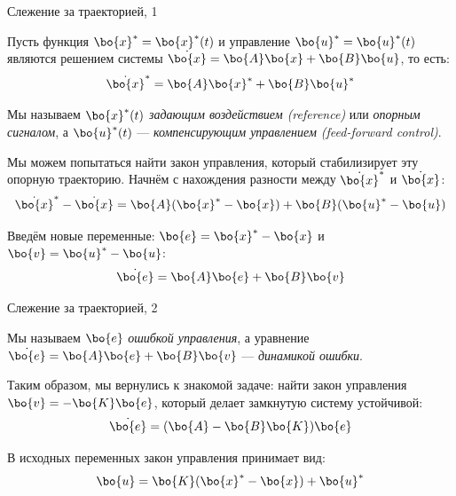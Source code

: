 \documentclass{beamer}
\begin{document}
\begin{frame}{Слежение за траекторией, 1}
	\begin{flushleft}
		
		Пусть функция $\bo{x}^* = \bo{x}^*(t)$ и управление $\bo{u}^* = \bo{u}^*(t)$ являются решением системы $\dot{\bo{x}} = \bo{A}\bo{x} + \bo{B}\bo{u}$, то есть:
		\begin{equation}
			\dot{\bo{x}}^* = \bo{A}\bo{x}^* + \bo{B}\bo{u}^*
		\end{equation}
		
		Мы называем $\bo{x}^*(t)$ \emph{задающим воздействием (reference)} или \emph{опорным сигналом}, а $\bo{u}^*(t)$ — \emph{компенсирующим управлением (feed-forward control)}.
		
		\bigskip
		
		Мы можем попытаться найти закон управления, который стабилизирует эту опорную траекторию. Начнём с нахождения разности между $\dot{\bo{x}}^*$ и $\dot{\bo{x}}$:
		\begin{equation}
			\dot{\bo{x}}^* - \dot{\bo{x}}= \bo{A}(\bo{x}^*-\bo{x}) + \bo{B}(\bo{u}^*-\bo{u})
		\end{equation}
		
		Введём новые переменные: $\bo{e} = \bo{x}^* - \bo{x}$ и $\bo{v} = \bo{u}^* - \bo{u}$:
		\begin{equation}
			\dot{\bo{e}} = \bo{A}\bo{e} + \bo{B}\bo{v}
		\end{equation}
		
	\end{flushleft}
\end{frame}



\begin{frame}{Слежение за траекторией, 2}
	\begin{flushleft}
		
		Мы называем $\bo{e}$ \emph{ошибкой управления}, а уравнение $\dot{\bo{e}} = \bo{A}\bo{e} + \bo{B}\bo{v}$ — \emph{динамикой ошибки}.
		
		\bigskip
		
		Таким образом, мы вернулись к знакомой задаче: найти закон управления $\bo{v} = -\bo{K}\bo{e}$, который делает замкнутую систему устойчивой:
		\begin{equation}
			\dot{\bo{e}} = (\bo{A} - \bo{B}\bo{K}) \bo{e}
		\end{equation}
		
		В исходных переменных закон управления принимает вид:
		\begin{equation}
			\bo{u} = \bo{K}(\bo{x}^* - \bo{x}) + \bo{u}^*
		\end{equation}
		
	\end{flushleft}
\end{frame}
\end{document}
